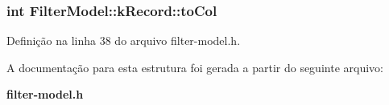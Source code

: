 \subsubsection[{to\+Col}]{\setlength{\rightskip}{0pt plus 5cm}int Filter\+Model\+::k\+Record\+::to\+Col}\label{struct_filter_model_1_1k_record_a2ee2c7977555a792c2f33a088bacb649}


Definição na linha 38 do arquivo filter-\/model.\+h.



A documentação para esta estrutura foi gerada a partir do seguinte arquivo\+:\begin{DoxyCompactItemize}
\item 
{\bf filter-\/model.\+h}\end{DoxyCompactItemize}
